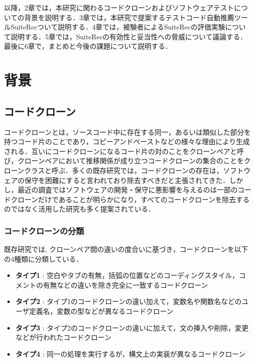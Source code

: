 \documentclass[12pt]{jarticle} %
\begin{document}
以降，2章では，本研究に関わるコードクローンおよびソフトウェアテストについての背景を説明する．3章では，本研究で提案するテストコード自動推薦ツール{\sf SuiteRec}ついて説明する．4章では，被験者による{\sf SuiteRec}の評価実験について説明する．5章では，{\sf SuiteRec}の有効性と妥当性への脅威について議論する．最後に6章で，まとめと今後の課題について説明する．


\newpage
\section{背景}
\subsection{コードクローン}

コードクローンとは，ソースコード中に存在する同一，あるいは類似した部分を持つコード片のことであり，コピーアンドペーストなどの様々な理由により生成される\cite{c1}．互いにコードクローンになるコード片の対のことをクローンペアと呼び，クローンペアにおいて推移関係が成り立つコードクローンの集合のことをクローンクラスと呼ぶ．多くの既存研究\cite{c2,c3,c1}では，コードクローンの存在は，ソフトウェアの保守を困難にすると言われており除去すべきだと主張されてきた．しかし，最近の調査ではソフトウェアの開発・保守に悪影響を与えるのは一部のコードクローンだけであることが明らかになり，すべてのコードクローンを除去するのではなく活用した研究も多く提案されている．

\subsubsection{コードクローンの分類}
既存研究\cite{c5,c4}では, クローンペア間の違いの度合いに基づき，コードクローンを以下の4種類に分類している．

\begin{itemize}
\item \textbf{タイプ1} : 空白やタブの有無，括弧の位置などのコーディングスタイル，コメントの有無などの違いを除き完全に一致するコードクローン
\item \textbf{タイプ2} : タイプ1のコードクローンの違い加えて，変数名や関数名などのユーザ定義名，変数の型などが異なるコードクローン
\item \textbf{タイプ3} : タイプ2のコードクローンの違いに加えて，文の挿入や削除，変更などが行われたコードクローン
\item \textbf{タイプ4} : 同一の処理を実行するが，構文上の実装が異なるコードクローン
\end{itemize}
\end{document}
